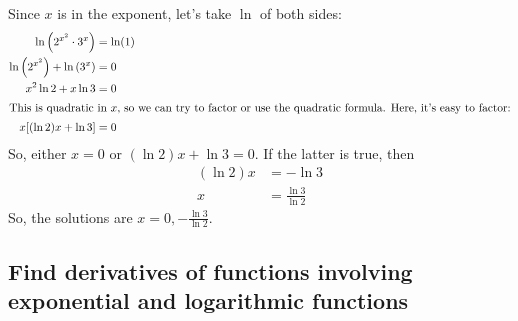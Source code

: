 \documentclass{article}
\theoremstyle{theorem}
\begin{document}
\begin{enumerate}[resume]
\begin{enumerate}
    \begin{solution}
      Since $x$ is in the exponent, let's take $\ln$ of both sides:
      \begin{align*}
        \ln \left( 2^{x^2} \cdot 3^x \right) &= \ln (1) \\
        \ln \left( 2^{x^2} \right) + \ln \left( 3^x \right) &= 0 \\
        x^2 \ln 2 + x \ln 3 &= 0 \\
        \intertext{This is quadratic in $x$, so we can try to factor or use the quadratic formula. Here, it's easy to factor:}
        x [(\ln 2) x + \ln 3] &= 0        
      \end{align*}
      So, either $x = 0$ or $(\ln 2) x + \ln 3 = 0$. If the latter is true, then
      \begin{align*}
        (\ln 2) x &= - \ln 3 \\
        x &= \frac{\ln 3}{\ln 2}
      \end{align*}
      So, the solutions are $x = \boxed{0, - \frac{\ln 3}{\ln 2}}$. 
    \end{solution}

  \end{enumerate}
\end{enumerate}

\subsection*{Find derivatives of functions involving exponential and logarithmic functions}
\end{document}
